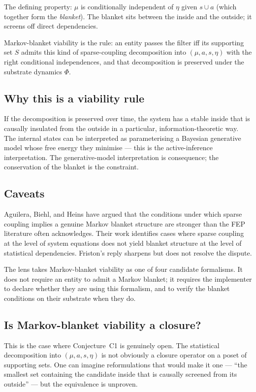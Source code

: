 The defining property: $\mu$ is conditionally independent of $\eta$
given $s \cup a$ (which together form the \emph{blanket}). The blanket
sits between the inside and the outside; it screens off direct
dependencies.

Markov-blanket viability is the rule: an entity passes the filter iff
its supporting set $S$ admits this kind of sparse-coupling
decomposition into $(\mu, a, s, \eta)$ with the right conditional
independences, and that decomposition is preserved under the substrate
dynamics $\Phi$.

\subsection*{Why this is a viability rule}

If the decomposition is preserved over time, the system has a stable
inside that is causally insulated from the outside in a particular,
information-theoretic way. The internal states can be interpreted as
parameterising a Bayesian generative model whose free energy they
minimise --- this is the active-inference interpretation. The
generative-model interpretation is consequence; the conservation of
the blanket is the constraint.

\subsection*{Caveats}

Aguilera, Biehl, and Heins have argued that the conditions under which
sparse coupling implies a genuine Markov blanket structure are
stronger than the FEP literature often acknowledges. Their work
identifies cases where sparse coupling at the level of system
equations does not yield blanket structure at the level of statistical
dependencies. Friston's reply sharpens but does not resolve the
dispute.

The lens takes Markov-blanket viability as one of four candidate
formalisms. It does not require an entity to admit a Markov blanket;
it requires the implementer to declare whether they are using this
formalism, and to verify the blanket conditions on their substrate
when they do.

\subsection*{Is Markov-blanket viability a closure?}

This is the case where Conjecture~C1 is genuinely open. The
statistical decomposition into $(\mu, a, s, \eta)$ is not obviously a
closure operator on a poset of supporting sets. One can imagine
reformulations that would make it one --- ``the smallest set
containing the candidate inside that is causally screened from its
outside'' --- but the equivalence is unproven.

